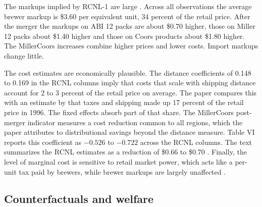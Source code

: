 The markups implied by RCNL-1 are large \citep[p.~1781]{MillerWeinberg2017}. Across all observations the average
brewer markup is \$3.60 per equivalent unit, 34 percent of the retail price. After the merger the markups on ABI 12
packs are about \$0.70 higher, those on Miller 12 packs about \$1.40 higher and those on Coors products about \$1.80
higher. The MillerCoors increases combine higher prices and lower costs. Import markups change little.

The cost estimates are economically plausible. The distance coefficients of 0.148 to 0.169 in the RCNL columns imply
that costs that scale with shipping distance account for 2 to 3 percent of the retail price on average. The paper
compares this with an estimate by \citet[p.~162]{TremblayTremblay2005} that taxes and shipping made up 17 percent of
the retail price in 1996. The fixed effects absorb part of that share. The MillerCoors post-merger indicator measures a
cost reduction common to all regions, which the paper attributes to distributional savings beyond the distance
measure. Table VI reports this coefficient as $-0.526$ to $-0.722$ across the RCNL columns. The text summarizes the
RCNL estimates as a reduction of \$0.66 to \$0.70 \citep[p.~1781]{MillerWeinberg2017}.
Finally, the level of marginal cost is sensitive to retail market power, which acts like a per-unit tax paid by
brewers, while brewer markups are largely unaffected \citep[n.~14]{MillerWeinberg2017}.

\subsection{Counterfactuals and welfare}\label{sec:11-mc-counterfactuals}

